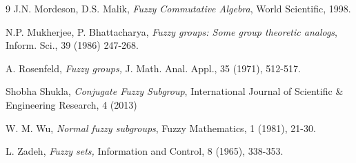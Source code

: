 \documentclass[10pt]{article}
\theoremstyle{plain}
\theoremstyle{definition}
\theoremstyle{remark}
\theoremstyle{case}
\begin{document}
\begin{thebibliography}{9}
	J.N. Mordeson, D.S. Malik,
	\textit{Fuzzy Commutative Algebra},
	World Scientific, 1998.
	
	N.P. Mukherjee, P. Bhattacharya, 
	\textit{Fuzzy groups: Some group theoretic analogs}, 
	Inform. Sci., 39 (1986) 247-268.
	
	A. Rosenfeld,
	\textit{Fuzzy groups,}
	J. Math. Anal. Appl., 35 (1971), 512-517.
	
	Shobha Shukla,
	\textit{Conjugate Fuzzy Subgroup},
	International Journal of Scientific \& Engineering Research, 4 (2013)
	
	W. M. Wu, 
	\textit{Normal fuzzy subgroups}, 
	Fuzzy Mathematics, 1 (1981), 21-30. 
	
	L. Zadeh,
	\textit{Fuzzy sets,} 
	Information and Control, 8 (1965), 338-353.
\end{thebibliography}
\end{document}
